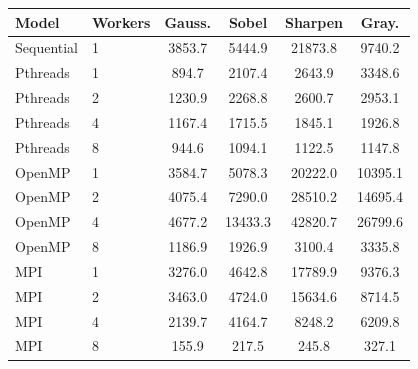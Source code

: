 \begin{tabular}{l l c c c c}
\toprule
Model & Workers & Gauss. & Sobel & Sharpen & Gray. \\
\midrule
Sequential & 1 & 3853.7 & 5444.9 & 21873.8 & 9740.2 \\
\midrule
Pthreads & 1 & 894.7 & 2107.4 & 2643.9 & 3348.6 \\
Pthreads & 2 & 1230.9 & 2268.8 & 2600.7 & 2953.1 \\
Pthreads & 4 & 1167.4 & 1715.5 & 1845.1 & 1926.8 \\
Pthreads & 8 & 944.6 & 1094.1 & 1122.5 & 1147.8 \\
\midrule
OpenMP & 1 & 3584.7 & 5078.3 & 20222.0 & 10395.1 \\
OpenMP & 2 & 4075.4 & 7290.0 & 28510.2 & 14695.4 \\
OpenMP & 4 & 4677.2 & 13433.3 & 42820.7 & 26799.6 \\
OpenMP & 8 & 1186.9 & 1926.9 & 3100.4 & 3335.8 \\
\midrule
MPI & 1 & 3276.0 & 4642.8 & 17789.9 & 9376.3 \\
MPI & 2 & 3463.0 & 4724.0 & 15634.6 & 8714.5 \\
MPI & 4 & 2139.7 & 4164.7 & 8248.2 & 6209.8 \\
MPI & 8 & 155.9 & 217.5 & 245.8 & 327.1 \\
\bottomrule
\end{tabular}
